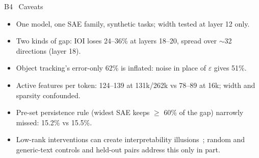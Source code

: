 \documentclass[aspectratio=169,10pt]{beamer}
\begin{document}
\begin{frame}{B4 \textperiodcentered\ Caveats}
  \small
  \begin{itemize}\setlength{\itemsep}{4pt}
    \item One model, one SAE family, synthetic tasks; width tested at layer 12 only.
    \item Two kinds of gap: IOI loses 24--36\% at layers 18--20, spread over $\sim$32 directions (layer 18).
    \item Object tracking's error-only 62\% is inflated: noise in place of $\varepsilon$ gives 51\%.
    \item Active features per token: 124--139 at 131k/262k vs 78--89 at 16k; width and sparsity confounded.
    \item Pre-set persistence rule (widest SAE keeps $\geq$ 60\% of the gap) narrowly missed: 15.2\% vs 15.5\%.
    \item Low-rank interventions can create interpretability illusions~\citep{makelov2024subspace}; random and
      generic-text controls and held-out pairs address this only in part.
  \end{itemize}
\end{frame}
\end{document}
